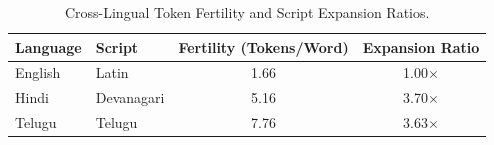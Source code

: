 \begin{table}[t]
\centering
\caption{Cross-Lingual Token Fertility and Script Expansion Ratios.}
\label{tab:token_fertility}
\begin{tabular}{llcc}
\toprule
\textbf{Language} & \textbf{Script} & \textbf{Fertility (Tokens/Word)} & \textbf{Expansion Ratio} \\
\midrule
English & Latin & 1.66 & 1.00$\times$ \\
Hindi & Devanagari & 5.16 & 3.70$\times$ \\
Telugu & Telugu & 7.76 & 3.63$\times$ \\
\bottomrule
\end{tabular}
\end{table}

